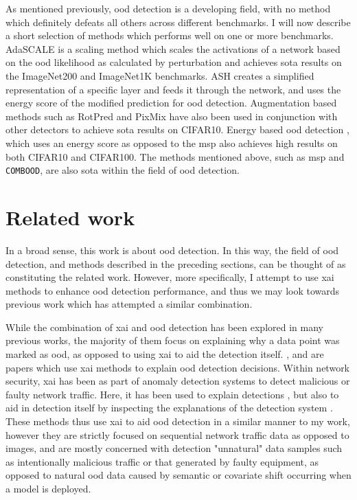 \documentclass[UKenglish]{uiomasterthesis} %
\theoremstyle{definition}
\begin{document}
As mentioned previously, \ac{ood} detection is a developing field, with no method which definitely defeats all others across different benchmarks. I will now describe a short selection of methods which performs well on one or more benchmarks. AdaSCALE \cite{adascale} is a scaling method which scales the activations of a network based on the \ac{ood} likelihood as calculated by perturbation and achieves \ac{sota} results on the ImageNet200 and ImageNet1K benchmarks. ASH \cite{ash} creates a simplified representation of a specific layer and feeds it through the network, and uses the energy score of the modified prediction for \ac{ood} detection. Augmentation based methods such as RotPred \cite{rotpred} and PixMix \cite{pixmix} have also been used in conjunction with other detectors to achieve \ac{sota} results on CIFAR10. Energy based \ac{ood} detection \cite{energy}, which uses an energy score as opposed to the \ac{msp} also achieves high results on both CIFAR10 and CIFAR100. The methods mentioned above, such as \ac{msp} and \texttt{COMBOOD}, are also \ac{sota} within the field of \ac{ood} detection.

\section{Related work} \label{section:relatedwork}

In a broad sense, this work is about \ac{ood} detection. In this way, the field of \ac{ood} detection, and methods described in the preceding sections, can be thought of as constituting the related work. However, more specifically, I attempt to use \ac{xai} methods to enhance \ac{ood} detection performance, and thus we may look towards previous work which has attempted a similar combination.

While the combination of \ac{xai} and \ac{ood} detection has been explored in many previous works, the majority of them focus on explaining why a data point was marked as \ac{ood}, as opposed to using \ac{xai} to aid the detection itself. \cite{uncertainty}, \cite{generalxaiforood} and \cite{tallon2020explainable} are papers which use \ac{xai} methods to explain \ac{ood} detection decisions. Within network security, \ac{xai} has been as part of anomaly detection systems to detect malicious or faulty network traffic. Here, it has been used to explain detections \cite{idsxai, mahbooba}, but also to aid in detection itself by inspecting the explanations of the detection system \cite{tcydenova2021detection, dnsxai}. These methods thus use \ac{xai} to aid \ac{ood} detection in a similar manner to my work, however they are strictly focused on sequential network traffic data as opposed to images, and are mostly concerned with detection "unnatural" data samples such as intentionally malicious traffic or that generated by faulty equipment, as opposed to natural \ac{ood} data caused by semantic or covariate shift occurring when a model is deployed.
\end{document}
